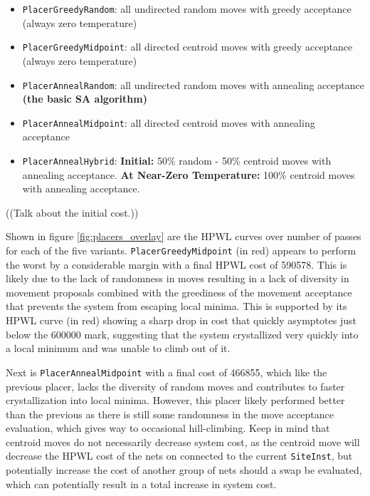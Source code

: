 \begin{itemize}
    \item \texttt{PlacerGreedyRandom}: all undirected random moves with greedy acceptance (always zero temperature)
    \item \texttt{PlacerGreedyMidpoint}: all directed centroid moves with greedy acceptance (always zero temperature)
    \item \texttt{PlacerAnnealRandom}: all undirected random moves with annealing acceptance \textbf{(the basic SA algorithm)}
    \item \texttt{PlacerAnnealMidpoint}: all directed centroid moves with annealing acceptance
    \item \texttt{PlacerAnnealHybrid}: \textbf{Initial:} 50\% random - 50\% centroid moves with annealing acceptance. \textbf{At Near-Zero Temperature:} 100\% centroid moves with annealing acceptance.
\end{itemize}

((Talk about the initial cost.))

Shown in figure \ref{fig:placers_overlay} are the HPWL curves over number of passes for each of the five variants. 
\texttt{PlacerGreedyMidpoint} (in red) appears to perform the worst by a considerable margin with a final HPWL cost of 590578.
This is likely due to the lack of randomness in moves resulting in a lack of diversity in movement proposals combined with the greediness of the movement acceptance that prevents the system from escaping local minima.
This is supported by its HPWL curve (in red) showing a sharp drop in cost that quickly asymptotes just below the 600000 mark, suggesting that the system crystallized very quickly into a local minimum and was unable to climb out of it.

Next is \texttt{PlacerAnnealMidpoint} with a final cost of 466855, which like the previous placer, lacks the diversity of random moves and contributes to faster crystallization into local minima.
However, this placer likely performed better than the previous as there is still some randomness in the move acceptance evaluation, which gives way to occasional hill-climbing. 
Keep in mind that centroid moves do not necessarily decrease system cost, as the centroid move will decrease the HPWL cost of the nets on connected to the current \texttt{SiteInst}, but potentially increase the cost of another group of nets should a swap be evaluated, which can potentially result in a total increase in system cost.

